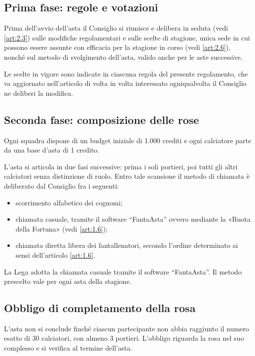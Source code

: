 \subsection{Prima fase: regole e votazioni}
\label{art:4.3.1}

Prima dell'avvio dell'asta il Consiglio si riunisce e delibera in seduta (vedi \ref{art:2.3}) sulle modifiche regolamentari e sulle scelte di stagione, unica sede in cui possono essere assunte con efficacia per la stagione in corso (vedi \ref{art:2.6}), nonché sul metodo di svolgimento dell'asta, valido anche per le aste successive.

Le scelte in vigore sono indicate in ciascuna regola del presente regolamento, che va aggiornato nell'articolo di volta in volta interessato ogniqualvolta il Consiglio ne deliberi la modifica.

\subsection{Seconda fase: composizione delle rose}
\label{art:4.3.2}

Ogni squadra dispone di un budget iniziale di 1.000 crediti e ogni calciatore parte da una base d'asta di 1 credito.

L'asta si articola in due fasi successive: prima i soli portieri, poi tutti gli altri calciatori senza distinzione di ruolo. Entro tale scansione il metodo di chiamata è deliberato dal Consiglio fra i seguenti:

\begin{itemize}
\item scorrimento alfabetico dei cognomi;
\item chiamata casuale, tramite il software “FantaAsta” ovvero mediante la «Ruota della Fortuna» (vedi \ref{art:1.6});
\item chiamata diretta libera dei fantallenatori, secondo l'ordine determinato ai sensi dell'articolo \ref{art:1.6}.
\end{itemize}

La Lega adotta la chiamata casuale tramite il software “FantaAsta”. Il metodo prescelto vale per ogni asta della stagione.

\subsection{Obbligo di completamento della rosa}
\label{art:4.3.3}

L'asta non si conclude finché ciascun partecipante non abbia raggiunto il numero esatto di 30 calciatori, con almeno 3 portieri. L'obbligo riguarda la rosa nel suo complesso e si verifica al termine dell'asta.

